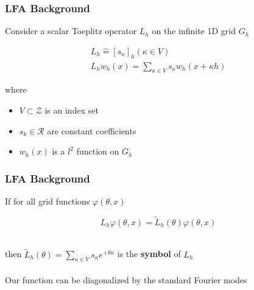 \documentclass{beamer}
\begin{document}
\begin{frame}
\begin{center}
\frametitle{LFA Background}

Consider a scalar Toeplitz operator $L_h$ on the infinite 1D grid $G_h$

\begin{equation}
\begin{gathered}
L_h \mathrel{\hat{=}} \left[ s_\kappa \right]_h \left( \kappa \in V \right)\\
L_h w_h \left( x \right) = \sum_{\kappa \in V} s_\kappa w_h \left( x + \kappa h \right)
\end{gathered}
\end{equation}

\begin{flushleft}
where
\end{flushleft}

\begin{itemize}

\item $V \subset \mathcal{Z}$ is an index set

\item $s_k \in \mathcal{R}$ are constant coefficients

\item $w_h \left( x \right)$ is a $l^2$ function on $G_h$

\end{itemize}

\end{center}
\end{frame}


\begin{frame}
\begin{center}
\frametitle{LFA Background}

If for all grid functions $\varphi \left( \theta, x \right)$

\begin{equation}
L_h \varphi \left( \theta, x \right) = \tilde{L}_h \left( \theta \right) \varphi \left( \theta, x \right)
\end{equation}

~\\

then $\tilde{L}_h \left( \theta \right) = \sum_{\kappa \in V} s_\kappa e^{\imath \theta \kappa}$ is the {\bf symbol} of $L_h$\\

~\\

Our function can be diagonalized by the standard Fourier modes

\end{center}
\end{frame}
\end{document}
